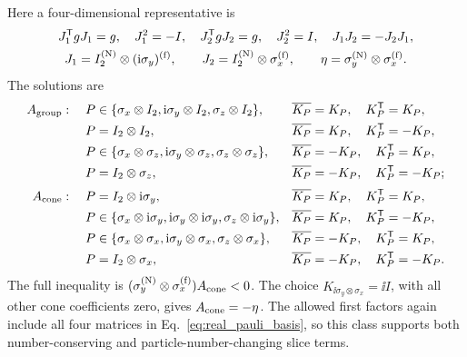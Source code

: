 Here a four-dimensional representative is
\begin{equation}
\begin{gathered}
J_1^{\mathsf{T}} gJ_1=g,\quad J_1^2=-I,\quad
J_2^{\mathsf{T}} gJ_2=g,\quad J_2^2=I,\quad
J_1J_2=-J_2J_1,\\
J_1=I_2^{({\rm N})}\otimes(\mathrm{i}\sigma_y)^{({\rm f})},\qquad
J_2=I_2^{({\rm N})}\otimes\sigma_x^{({\rm f})},\qquad
\eta=\sigma_y^{({\rm N})}\otimes\sigma_x^{({\rm f})}.
\end{gathered}
\end{equation}
The solutions are
\begin{align*}
A_{\rm group}:\quad
P&\in\{\sigma_x\otimes I_2,\mathrm{i}\sigma_y\otimes I_2,\sigma_z\otimes I_2\},
&&\overline{K_P}=K_P,\quad K_P^{\mathsf{T}}=K_P,\\
P&=I_2\otimes I_2,&&\overline{K_P}=K_P,\quad K_P^{\mathsf{T}}=-K_P,\\
P&\in\{\sigma_x\otimes\sigma_z,\mathrm{i}\sigma_y\otimes\sigma_z,
\sigma_z\otimes\sigma_z\},&&\overline{K_P}=-K_P,\quad K_P^{\mathsf{T}}=K_P,\\
P&=I_2\otimes\sigma_z,&&\overline{K_P}=-K_P,\quad K_P^{\mathsf{T}}=-K_P;\\[2pt]
A_{\rm cone}:\quad
P&=I_2\otimes\mathrm{i}\sigma_y,&&\overline{K_P}=K_P,\quad K_P^{\mathsf{T}}=K_P,\\
P&\in\{\sigma_x\otimes\mathrm{i}\sigma_y,\mathrm{i}\sigma_y\otimes\mathrm{i}\sigma_y,
\sigma_z\otimes\mathrm{i}\sigma_y\},&&\overline{K_P}=K_P,\quad K_P^{\mathsf{T}}=-K_P,\\
P&\in\{\sigma_x\otimes\sigma_x,\mathrm{i}\sigma_y\otimes\sigma_x,
\sigma_z\otimes\sigma_x\},&&\overline{K_P}=-K_P,\quad K_P^{\mathsf{T}}=K_P,\\
P&=I_2\otimes\sigma_x,&&\overline{K_P}=-K_P,\quad K_P^{\mathsf{T}}=-K_P.
\end{align*}
The full inequality is \((\sigma_y^{({\rm N})}\otimes\sigma_x^{({\rm f})})A_{\rm cone}<0\).  The choice
\(K_{\ii\sigma_y\otimes\sigma_x}=\ii I\), with all other cone coefficients zero, gives \(A_{\rm cone}=-\eta\).  The allowed first factors again include all four matrices in Eq.~\eqref{eq:real_pauli_basis}, so this class supports both number-conserving and particle-number-changing slice terms.

